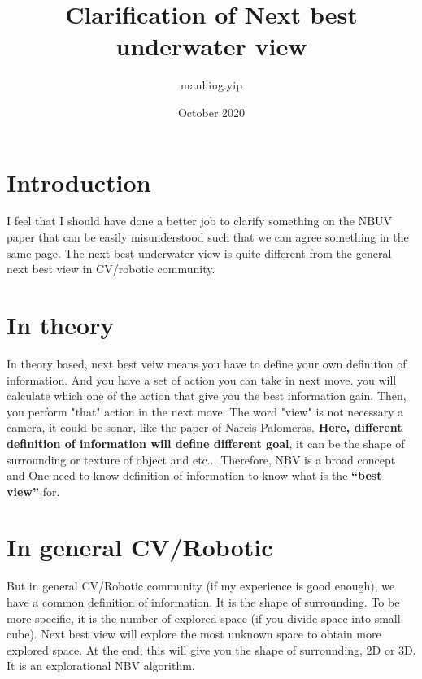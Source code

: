 \documentclass{article}
\title{Clarification of Next best underwater view}
\author{mauhing.yip }
\date{October 2020}
\begin{document}
\maketitle

\section{Introduction}
I feel that I should have done a better job to clarify something on the NBUV paper that can be easily misunderstood such that we can agree something in the same page. The next best underwater view is quite different from the general next best view in CV/robotic community.

\section{In theory}
In theory based, next best veiw means you have to define your own definition of information. And you have a set of action you can take in next move. you will calculate which one of the action that give you the best information gain. Then, you perform "that" action in the next move. The word "view" is not necessary a camera, it could be sonar, like the paper of Narcis Palomeras. \textbf{Here, different definition of information will define different goal}, it can be the shape of surrounding or texture of object and etc... Therefore, NBV is a broad concept and One need to know definition of information to know what is the \textbf{``best view''} for. 

\section{In general CV/Robotic}
But in general CV/Robotic community (if my experience is good enough), we have a common definition of information. It is the shape of surrounding. To be more specific, it is the number of explored space (if you divide space into small cube). Next best view will explore the most unknown space to obtain more explored space. At the end, this will give you the shape of surrounding, 2D or 3D. It is an explorational NBV algorithm. 
\end{document}
